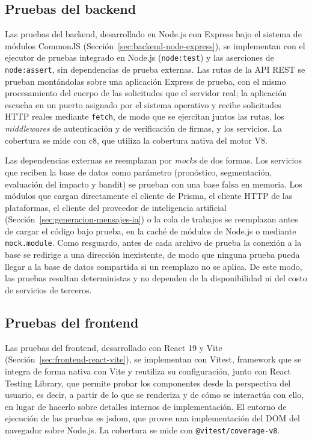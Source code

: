 \subsection{Pruebas del backend}
\label{sec:pruebas-backend}

Las pruebas del backend, desarrollado en Node.js con Express bajo el sistema de módulos CommonJS (Sección~\ref{sec:backend-node-express}), se implementan con el ejecutor de pruebas integrado en Node.js (\texttt{node:test}) y las aserciones de \texttt{node:assert}, sin dependencias de prueba externas. Las rutas de la API REST se prueban montándolas sobre una aplicación Express de prueba, con el mismo procesamiento del cuerpo de las solicitudes que el servidor real; la aplicación escucha en un puerto asignado por el sistema operativo y recibe solicitudes HTTP reales mediante \texttt{fetch}, de modo que se ejercitan juntos las rutas, los \emph{middlewares} de autenticación y de verificación de firmas, y los servicios. La cobertura se mide con c8, que utiliza la cobertura nativa del motor V8.

Las dependencias externas se reemplazan por \emph{mocks} de dos formas. Los servicios que reciben la base de datos como parámetro (pronóstico, segmentación, evaluación del impacto y bandit) se prueban con una base falsa en memoria. Los módulos que cargan directamente el cliente de Prisma, el cliente HTTP de las plataformas, el cliente del proveedor de inteligencia artificial (Sección~\ref{sec:generacion-mensajes-ia}) o la cola de trabajos se reemplazan antes de cargar el código bajo prueba, en la caché de módulos de Node.js o mediante \texttt{mock.module}. Como resguardo, antes de cada archivo de prueba la conexión a la base se redirige a una dirección inexistente, de modo que ninguna prueba pueda llegar a la base de datos compartida si un reemplazo no se aplica. De este modo, las pruebas resultan deterministas y no dependen de la disponibilidad ni del costo de servicios de terceros.

\subsection{Pruebas del frontend}
\label{sec:pruebas-frontend}

Las pruebas del frontend, desarrollado con React 19 y Vite (Sección~\ref{sec:frontend-react-vite}), se implementan con Vitest, framework que se integra de forma nativa con Vite y reutiliza su configuración, junto con React Testing Library, que permite probar los componentes desde la perspectiva del usuario, es decir, a partir de lo que se renderiza y de cómo se interactúa con ello, en lugar de hacerlo sobre detalles internos de implementación. El entorno de ejecución de las pruebas es jsdom, que provee una implementación del DOM del navegador sobre Node.js. La cobertura se mide con \texttt{@vitest/coverage-v8}.

